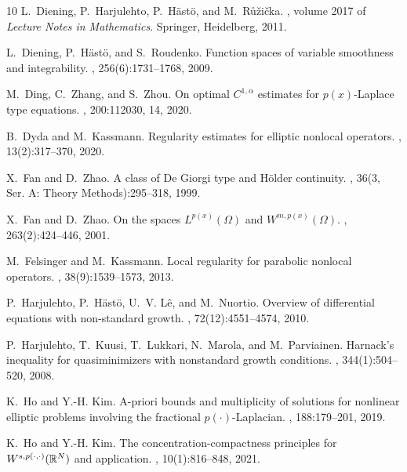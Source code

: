 \documentclass[11pt]{amsart}
\theoremstyle{plain}
\theoremstyle{definition}
\numberwithin{equation}{section}
\begin{document}
\begin{thebibliography}{10}
L.~Diening, P.~Harjulehto, P.~H\"{a}st\"{o}, and M.~R{\r u}\v{z}i\v{c}ka.
, volume
  2017 of {\em Lecture Notes in Mathematics}.
\newblock Springer, Heidelberg, 2011.

L.~Diening, P.~H\"{a}st\"{o}, and S.~Roudenko.
\newblock Function spaces of variable smoothness and integrability.
, 256(6):1731--1768, 2009.

M.~Ding, C.~Zhang, and S.~Zhou.
\newblock On optimal {$C^{1,\alpha}$} estimates for {$p(x)$}-{L}aplace type
  equations.
, 200:112030, 14, 2020.

B.~Dyda and M.~Kassmann.
\newblock Regularity estimates for elliptic nonlocal operators.
, 13(2):317--370, 2020.

X.~Fan and D.~Zhao.
\newblock A class of {D}e {G}iorgi type and {H}\"{o}lder continuity.
, 36(3, Ser. A: Theory Methods):295--318, 1999.

X.~Fan and D.~Zhao.
\newblock On the spaces {$L^{p(x)}(\Omega)$} and {$W^{m,p(x)}(\Omega)$}.
, 263(2):424--446, 2001.

M.~Felsinger and M.~Kassmann.
\newblock Local regularity for parabolic nonlocal operators.
, 38(9):1539--1573, 2013.

P.~Harjulehto, P.~H\"{a}st\"{o}, U.~V. L\^{e}, and M.~Nuortio.
\newblock Overview of differential equations with non-standard growth.
, 72(12):4551--4574, 2010.

P.~Harjulehto, T.~Kuusi, T.~Lukkari, N.~Marola, and M.~Parviainen.
\newblock Harnack's inequality for quasiminimizers with nonstandard growth
  conditions.
, 344(1):504--520, 2008.

K.~Ho and Y.-H. Kim.
\newblock A-priori bounds and multiplicity of solutions for nonlinear elliptic
  problems involving the fractional {$p(\cdot)$}-{L}aplacian.
, 188:179--201, 2019.

K.~Ho and Y.-H. Kim.
\newblock The concentration-compactness principles for
  {$W^{s,p(\cdot,\cdot)}(\Bbb R^N)$} and application.
, 10(1):816--848, 2021.


\end{thebibliography}
\end{document}
